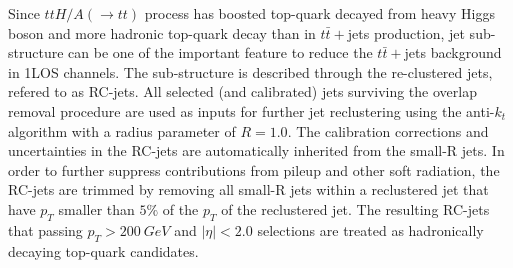 Since $ttH/A(\rightarrow tt)$ process has boosted top-quark decayed from heavy Higgs boson and more hadronic top-quark decay than in $t\bar{t}+$jets production, jet sub-structure can be one of the important feature to reduce the $t\bar{t}+$jets background in 1LOS channels.
The sub-structure is described through the re-clustered jets, refered to as RC-jets.
All selected (and calibrated) jets surviving the overlap removal procedure are used as inputs for further jet reclustering using the anti-$k_{t}$ algorithm with a radius parameter of $R=1.0$.
The calibration corrections and uncertainties in the RC-jets are automatically inherited from the small-R jets.
In order to further suppress contributions from pileup and other soft radiation, the RC-jets are trimmed by removing all small-R jets within a reclustered jet that have $p_{T}$ smaller than $5\%$ of the $p_{T}$ of the reclustered jet.
The resulting RC-jets that passing $p_{T}>200~GeV$ and $\left| \eta \right|<2.0$ selections are treated as hadronically decaying top-quark candidates.


